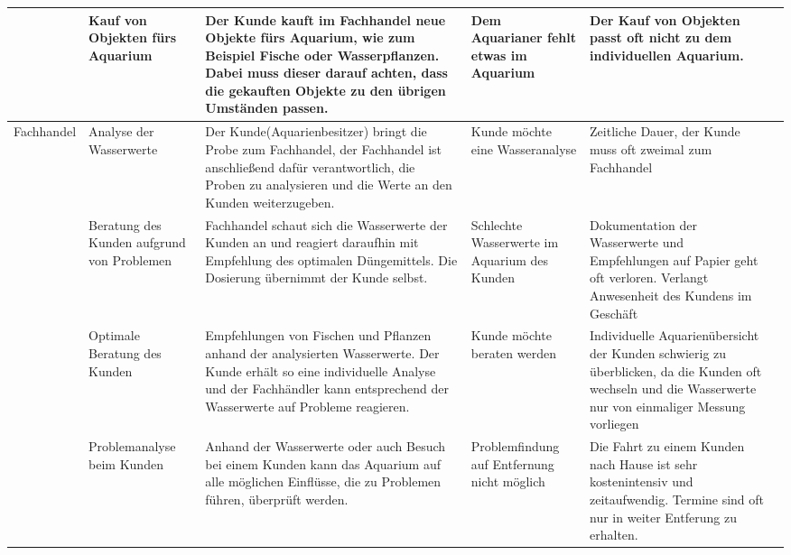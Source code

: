 \begin{table}[]
{\begin{tabular}{|p{4cm}|p{4cm}|p{6cm}|p{3cm}|p{4cm}|l}
 & Kauf von Objekten fürs Aquarium & Der Kunde kauft im Fachhandel neue Objekte fürs Aquarium, wie zum Beispiel Fische oder Wasserpflanzen. Dabei muss dieser darauf achten, dass die gekauften Objekte zu den übrigen Umständen passen. & Dem Aquarianer fehlt etwas im Aquarium & Der Kauf von Objekten passt oft nicht zu dem individuellen Aquarium. \\ \hline
\multirow{4}{*}{Fachhandel} & Analyse der Wasserwerte & Der Kunde(Aquarienbesitzer) bringt die Probe zum Fachhandel, der Fachhandel ist anschließend dafür verantwortlich, die Proben zu analysieren und die Werte an den Kunden weiterzugeben. & Kunde möchte eine Wasseranalyse & Zeitliche Dauer, der Kunde muss oft zweimal zum Fachhandel \\ \cline{2-5} 
 & Beratung des Kunden aufgrund von Problemen & Fachhandel schaut sich die Wasserwerte der Kunden an und reagiert daraufhin mit Empfehlung des optimalen Düngemittels. Die Dosierung übernimmt der Kunde selbst. & Schlechte Wasserwerte im Aquarium des Kunden & Dokumentation der Wasserwerte und Empfehlungen auf Papier geht oft verloren. Verlangt Anwesenheit des Kundens im Geschäft \\ \cline{2-5} 
 & Optimale Beratung des Kunden & Empfehlungen von Fischen und Pflanzen anhand der analysierten Wasserwerte. Der Kunde erhält so eine individuelle Analyse und der Fachhändler kann entsprechend der Wasserwerte auf Probleme reagieren. & Kunde möchte beraten werden & Individuelle Aquarienübersicht der Kunden schwierig zu überblicken, da die Kunden oft wechseln und die Wasserwerte nur von einmaliger Messung vorliegen \\ \cline{2-5} 
 & Problemanalyse beim Kunden & Anhand der Wasserwerte oder auch Besuch bei einem Kunden kann das Aquarium auf alle möglichen Einflüsse, die zu Problemen führen, überprüft werden. & Problemfindung auf Entfernung nicht möglich & Die Fahrt zu einem Kunden nach Hause ist sehr kostenintensiv und zeitaufwendig. Termine sind oft nur in weiter Entferung zu erhalten. \\ \hline
\end{tabular}%
}
\end{table}